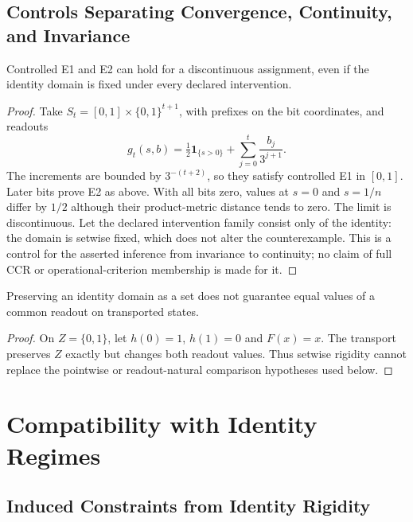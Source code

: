 \subsection{Controls Separating Convergence, Continuity, and Invariance}

\begin{proposition}\label{prop:readout-continuity-control}
Controlled E1 and E2 can hold for a discontinuous assignment, even if the identity domain is fixed under every declared intervention.
\end{proposition}

\begin{proof}
Take $S_t=[0,1]\times\{0,1\}^{t+1}$, with prefixes on the bit coordinates, and readouts
\[
g_t(s,b)=\tfrac12\mathbf1_{\{s>0\}}+\sum_{j=0}^t\frac{b_j}{3^{j+1}}.
\]
The increments are bounded by $3^{-(t+2)}$, so they satisfy controlled E1 in $[0,1]$. Later bits prove E2 as above. With all bits zero, values at $s=0$ and $s=1/n$ differ by $1/2$ although their product-metric distance tends to zero. The limit is discontinuous. Let the declared intervention family consist only of the identity: the domain is setwise fixed, which does not alter the counterexample. This is a control for the asserted inference from invariance to continuity; no claim of full CCR or operational-criterion membership is made for it.
\end{proof}

\begin{proposition}\label{prop:transport-control}
Preserving an identity domain as a set does not guarantee equal values of a common readout on transported states.
\end{proposition}

\begin{proof}
On $Z=\{0,1\}$, let $h(0)=1$, $h(1)=0$ and $F(x)=x$. The transport preserves $Z$ exactly but changes both readout values. Thus setwise rigidity cannot replace the pointwise or readout-natural comparison hypotheses used below.
\end{proof}

\section{Compatibility with Identity Regimes}

\subsection{Induced Constraints from Identity Rigidity}

